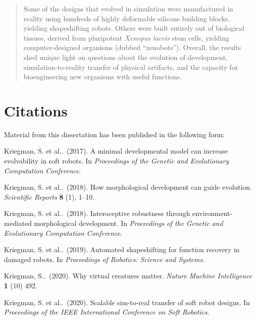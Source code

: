 \documentclass[12pt]{report}
\begin{document}
\begin{abstract}
Some of the designs that evolved in simulation were manufactured in reality using hundreds of highly deformable silicone building blocks, yielding shapeshifting robots.
Others were built entirely out of biological tissues, derived from pluripotent 
\textit{Xenopus laevis} 
stem cells, yielding computer-designed organisms (dubbed ``xenobots'').
Overall, 
the results 
shed unique light on questions about
the evolution of development,
simulation-to-reality transfer of physical artifacts,
and the capacity for
bioengineering new 
organisms
with useful functions.





\end{abstract}


\section*{Citations}

\vspace{3em}
Material from this dissertation has been published in the following form:
\vspace{1em}

\vspace{1.5em}
\noindent
Kriegman, S. et al..~(2017).
A minimal developmental model can increase evolvability in soft robots. In
\textit{Proceedings of the Genetic and Evolutionary Computation Conference}.


\vspace{1.5em}
\noindent
Kriegman, S. et al..~(2018). How morphological development can guide evolution. \textit{Scientific Reports} \textbf{8} (1), 1--10.

\vspace{1.5em}
\noindent
Kriegman, S. et al..~(2018).
Interoceptive robustness through environment-mediated morphological development. In
\textit{Proceedings of the Genetic and Evolutionary Computation Conference}.

\vspace{1.5em}
\noindent
Kriegman, S. et al..~(2019).
Automated shapeshifting for function recovery in damaged robots. 
In
\textit{Proceedings of Robotics: Science and Systems}.

\vspace{1.5em}
\noindent
Kriegman, S..~(2020).
Why virtual creatures matter. 
\textit{Nature Machine Intelligence} \textbf{1} (10) 492. 

\vspace{1.5em}
\noindent
Kriegman, S. et al..~(2020).
Scalable sim-to-real transfer of soft robot designs.
In
\textit{Proceedings of the IEEE International Conference on Soft Robotics}.
\end{document}
